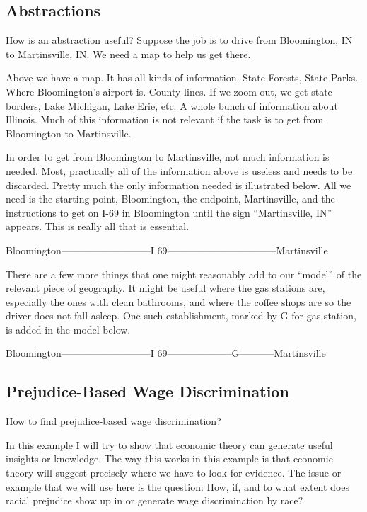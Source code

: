 \documentclass[
]{book}
\begin{document}
\hypertarget{abstractions}{%
\subsection{Abstractions}\label{abstractions}}

How is an abstraction useful? Suppose the job is to drive from Bloomington, IN to Martinsville, IN. We need a map to help us get there.

\newpage{}

Above we have a map. It has all kinds of information. State Forests, State Parks. Where Bloomington's airport is. County lines. If we zoom out, we get state borders, Lake Michigan, Lake Erie, etc. A whole bunch of information about Illinois. Much of this information is not relevant if the task is to get from Bloomington to Martinsville.

In order to get from Bloomington to Martinsville, not much information is needed. Most, practically all of the information above is useless and needs to be discarded. Pretty much the only information needed is illustrated below. All we need is the starting point, Bloomington, the endpoint, Martinsville, and the instructions to get on I-69 in Bloomington until the sign ``Martinsville, IN'' appears. This is really all that is essential.

Bloomington---------------------------I 69---------------------------------Martinsville

There are a few more things that one might reasonably add to our ``model'' of the relevant piece of geography. It might be useful where the gas stations are, especially the ones with clean bathrooms, and where the coffee shops are so the driver does not fall asleep. One such establishment, marked by G for gas station, is added in the model below.

Bloomington---------------------------I 69--------------------G-----------Martinsville

\hypertarget{prejudice-based-wage-discrimination}{%
\subsection{Prejudice-Based Wage Discrimination}\label{prejudice-based-wage-discrimination}}

How to find prejudice-based wage discrimination?

In this example I will try to show that economic theory can generate useful insights or knowledge. The way this works in this example is that economic theory will suggest precisely where we have to look for evidence. The issue or example that we will use here is the question:
How, if, and to what extent does racial prejudice show up in or generate wage discrimination by race?
\end{document}
